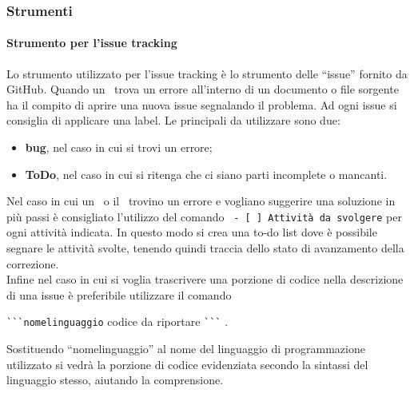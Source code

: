 \documentclass[../NormeProgetto.tex]{subfiles}
\begin{document}
	\subsubsection{Strumenti} \label{sec:Strumenti}
		\paragraph{Strumento per l'issue tracking}
		Lo strumento utilizzato per l'issue tracking è lo strumento delle ``issue'' fornito da GitHub. Quando un \verificatore\ trova un errore all'interno di un documento o file sorgente ha il compito di aprire una nuova issue segnalando il problema. Ad ogni issue si consiglia di applicare una label. Le principali da utilizzare sono due:
		\begin{itemize}
			\item \textbf{bug}, nel caso in cui si trovi un errore;
			\item \textbf{ToDo}, nel caso in cui si ritenga che ci siano parti incomplete o mancanti.
		\end{itemize}
		Nel caso in cui un \verificatore\ o il \responsabilediprogetto\ trovino un errore e vogliano suggerire una soluzione in più passi è consigliato l'utilizzo del comando \texttt{ - [ ] Attività da svolgere} per ogni attività indicata. In questo modo si crea una to-do list dove è possibile segnare le attività svolte, tenendo quindi traccia dello stato di avanzamento della correzione.\\ Infine nel caso in cui si voglia trascrivere una porzione di codice nella descrizione di una issue è preferibile utilizzare il comando \begin{center} \texttt {\`{}\`{}\`{}nomelinguaggio} codice da riportare \texttt{\`{}\`{}\`{}} .\end{center} Sostituendo ``nomelinguaggio'' al nome del linguaggio di programmazione utilizzato si vedrà la porzione di codice evidenziata secondo la sintassi del linguaggio stesso, aiutando la comprensione.
\end{document}
